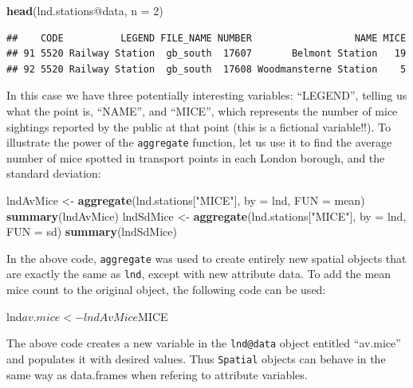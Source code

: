 \documentclass[]{article}
\newenvironment{Shaded}{}{}
\newcommand{\KeywordTok}[1]{\textcolor[rgb]{0.00,0.44,0.13}{\textbf{{#1}}}}
\newcommand{\DataTypeTok}[1]{\textcolor[rgb]{0.56,0.13,0.00}{{#1}}}
\newcommand{\DecValTok}[1]{\textcolor[rgb]{0.25,0.63,0.44}{{#1}}}
\newcommand{\StringTok}[1]{\textcolor[rgb]{0.25,0.44,0.63}{{#1}}}
\newcommand{\NormalTok}[1]{{#1}}
\begin{document}
\begin{Shaded}
\begin{Highlighting}[]
\KeywordTok{head}\NormalTok{(lnd.stations@data, }\DataTypeTok{n =} \DecValTok{2}\NormalTok{)}
\end{Highlighting}
\end{Shaded}
\begin{verbatim}
##    CODE          LEGEND FILE_NAME NUMBER                  NAME MICE
## 91 5520 Railway Station  gb_south  17607       Belmont Station   19
## 92 5520 Railway Station  gb_south  17608 Woodmansterne Station    5
\end{verbatim}
In this case we have three potentially interesting variables:
``LEGEND'', telling us what the point is, ``NAME'', and ``MICE'', which
represents the number of mice sightings reported by the public at that
point (this is a fictional variable!!). To illustrate the power of the
\texttt{aggregate} function, let us use it to find the average number of
mice spotted in transport points in each London borough, and the
standard deviation:

\begin{Shaded}
\begin{Highlighting}[]
\NormalTok{lndAvMice <- }\KeywordTok{aggregate}\NormalTok{(lnd.stations[}\StringTok{"MICE"}\NormalTok{], }\DataTypeTok{by =} \NormalTok{lnd, }\DataTypeTok{FUN =} \NormalTok{mean)}
\KeywordTok{summary}\NormalTok{(lndAvMice)}
\NormalTok{lndSdMice <- }\KeywordTok{aggregate}\NormalTok{(lnd.stations[}\StringTok{"MICE"}\NormalTok{], }\DataTypeTok{by =} \NormalTok{lnd, }\DataTypeTok{FUN =} \NormalTok{sd)}
\KeywordTok{summary}\NormalTok{(lndSdMice)}
\end{Highlighting}
\end{Shaded}
In the above code, \texttt{aggregate} was used to create entirely new
spatial objects that are exactly the same as \texttt{lnd}, except with
new attribute data. To add the mean mice count to the original object,
the following code can be used:

\begin{Shaded}
\begin{Highlighting}[]
\NormalTok{lnd$av.mice <- lndAvMice$MICE}
\end{Highlighting}
\end{Shaded}
The above code creates a new variable in the \texttt{lnd@data} object
entitled ``av.mice'' and populates it with desired values. Thus
\texttt{Spatial} objects can behave in the same way as data.frames when
refering to attribute variables.
\end{document}
